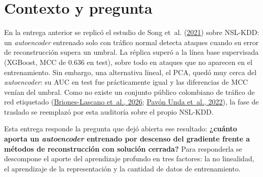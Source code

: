 \documentclass[
  11pt,
]{article}
\begin{document}
\begin{titlepage}
\vspace{1.2cm}


\end{titlepage}


\hypertarget{sec:contexto}{%
\section{Contexto y pregunta}\label{sec:contexto}}

En la entrega anterior se replicó el estudio de Song et~al. (\protect\hyperlink{ref-songAutoencoders2021}{2021}) sobre NSL-KDD: un \emph{autoencoder}
entrenado solo con tráfico normal detecta ataques cuando su error de reconstrucción supera un umbral.
La réplica superó a la línea base supervisada (XGBoost, MCC de 0.636 en test), sobre todo en ataques
que no aparecen en el entrenamiento. Sin embargo, una alternativa lineal, el PCA, quedó muy cerca del
\emph{autoencoder}: su AUC en test fue prácticamente igual y las diferencias de MCC venían del umbral. Como
no existe un conjunto público colombiano de tráfico de red etiquetado (\protect\hyperlink{ref-brionesLascano2026}{Briones-Lascano et~al., 2026}; \protect\hyperlink{ref-pavonUnda2022}{Pavón Unda et~al., 2022}), la fase de traslado se reemplazó por esta auditoría sobre el propio NSL-KDD.

Esta entrega responde la pregunta que dejó abierta ese resultado: \textbf{¿cuánto aporta un \emph{autoencoder}
entrenado por descenso del gradiente frente a métodos de reconstrucción con solución cerrada?} Para
responderla se descompone el aporte del aprendizaje profundo en tres factores: la no linealidad, el
aprendizaje de la representación y la cantidad de datos de entrenamiento.
\end{document}
